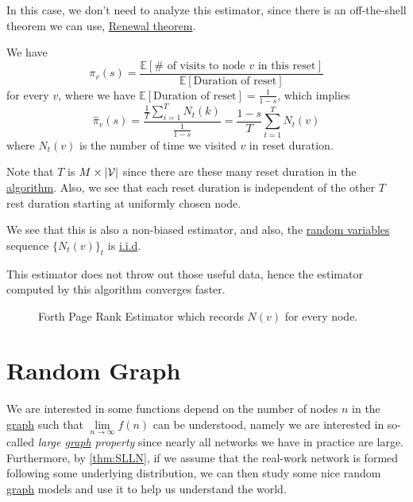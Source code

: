In this case, we don't need to analyze this estimator, since there is an off-the-shell theorem we can use, \href{https://en.wikipedia.org/wiki/Renewal_theory}{Renewal theorem}.
\begin{theorem}\label{thm:Renewal-theorem}
	We have
	\[
		\pi_v(s) = \frac{\mathbb{E}\left[\# \text{ of visits to node \(v\) in this reset} \right]}{\mathbb{E}\left[\text{Duration of reset} \right] }
	\]
	for every \(v\), where we have \(\mathbb{E}\left[\text{Duration of reset} \right] =\frac{1}{1-s}\), which implies
	\[
		\hat{\pi}_v(s) = \frac{\frac{1}{T}\sum_{i=1}^{T} N_t(k)}{\frac{1}{1-s}} = \frac{1-s}{T}\sum\limits_{t=1}^{T} N_t(v)
	\]
	where \(N_t(v)\) is the number of time we visited \(v\) in reset duration.
\end{theorem}
\begin{note}
	Note that \(T\) is \(M\times \left\vert \mathcal{\MakeUppercase{v}}  \right\vert \) since there are these many reset duration in the \hyperref[algo:Monte-Carlo-algorithm-4]{algorithm}. Also, we see that each reset duration is independent of the other \(T\) rest duration starting at uniformly chosen node.
\end{note}

We see that this is also a non-biased estimator, and also, the \hyperref[def:random-variable]{random variables} sequence \(\{N_t(v)\}_t\) is \hyperref[def:i.i.d.]{i.i.d}.

\begin{remark}
	This estimator does not throw out those useful data, hence the estimator computed by this algorithm converges faster.
\end{remark}

\begin{figure}[H]
	\centering
	\caption{Forth Page Rank Estimator which records \(N(v)\) for every node.}
	\label{fig:Monte-Carlo-Estimator-4}
\end{figure}

\chapter{Random Graph}
We are interested in some functions depend on the number of nodes \(n\) in the \hyperref[def:graph]{graph} such that \(\lim\limits_{n\to \infty }f(n)\) can be understood, namely we are interested in so-called \emph{large \hyperref[def:graph]{graph} property} since nearly all networks we have in practice are large. Furthermore, by \autoref{thm:SLLN}, if we assume that the real-work network is formed following some underlying distribution, we can then study some nice random \hyperref[def:graph]{graph} models and use it to help us understand the world.

